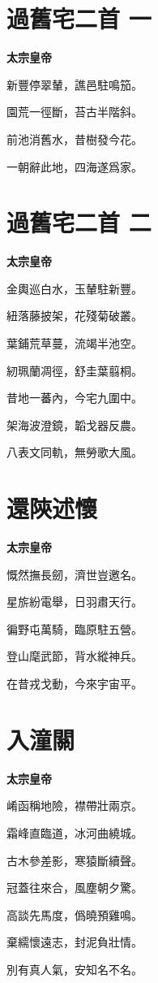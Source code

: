 \documentclass[12pt,a4paper]{ctexbook}
\begin{document}
\section{過舊宅二首 一}
\textbf{太宗皇帝}\par\vspace{0.5em}
新豐停翠輦，譙邑駐鳴笳。\par
園荒一徑斷，苔古半階斜。\par
前池消舊水，昔樹發今花。\par
一朝辭此地，四海遂爲家。\par

\section{過舊宅二首 二}
\textbf{太宗皇帝}\par\vspace{0.5em}
金輿巡白水，玉輦駐新豐。\par
紐落藤披架，花殘菊破叢。\par
葉鋪荒草蔓，流竭半池空。\par
紉珮蘭凋徑，舒圭葉翦桐。\par
昔地一蕃內，今宅九圍中。\par
架海波澄鏡，韜戈器反農。\par
八表文同軌，無勞歌大風。\par

\section{還陝述懷}
\textbf{太宗皇帝}\par\vspace{0.5em}
慨然撫長劒，濟世豈邀名。\par
星旂紛電舉，日羽肅天行。\par
徧野屯萬騎，臨原駐五營。\par
登山麾武節，背水縱神兵。\par
在昔戎戈動，今來宇宙平。\par

\section{入潼關}
\textbf{太宗皇帝}\par\vspace{0.5em}
崤函稱地險，襟帶壯兩京。\par
霜峰直臨道，冰河曲繞城。\par
古木參差影，寒猿斷續聲。\par
冠蓋往來合，風塵朝夕驚。\par
高談先馬度，僞曉預雞鳴。\par
棄繻懷遠志，封泥負壯情。\par
別有真人氣，安知名不名。\par
\end{document}
